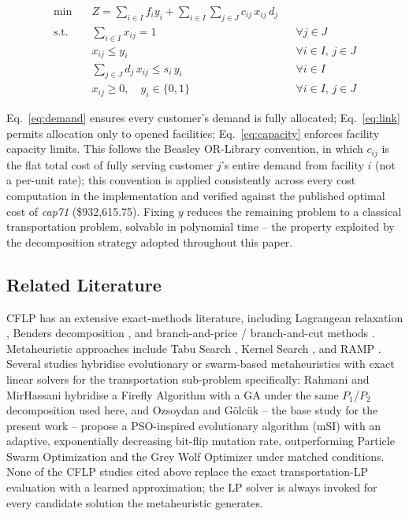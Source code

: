 \documentclass[conference]{IEEEtran}
\begin{document}
\begin{align}
\min \quad & Z = \sum_{i \in I} f_i y_i + \sum_{i \in I} \sum_{j \in J} c_{ij}\, x_{ij}\, d_j
\label{eq:obj} \\
\text{s.t.} \quad
& \sum_{i \in I} x_{ij} = 1 && \forall j \in J \label{eq:demand} \\
& x_{ij} \le y_i && \forall i \in I,\, j \in J \label{eq:link} \\
& \sum_{j \in J} d_j\, x_{ij} \le s_i\, y_i && \forall i \in I \label{eq:capacity} \\
& x_{ij} \ge 0, \quad y_i \in \{0,1\} && \forall i \in I,\, j \in J \label{eq:domain}
\end{align}

Eq.~\eqref{eq:demand} ensures every customer's demand is fully allocated;
Eq.~\eqref{eq:link} permits allocation only to opened facilities;
Eq.~\eqref{eq:capacity} enforces facility capacity limits. This follows the
Beasley OR-Library convention, in which $c_{ij}$ is the flat total cost of
fully serving customer $j$'s entire demand from facility $i$ (not a per-unit
rate); this convention is applied consistently across every cost computation
in the implementation and verified against the published optimal cost of
\emph{cap71} (\$932{,}615.75). Fixing $y$ reduces the remaining problem to a
classical transportation problem, solvable in polynomial time -- the property
exploited by the decomposition strategy adopted throughout this paper.

\subsection{Related Literature}

CFLP has an extensive exact-methods literature, including Lagrangean
relaxation \citep{christofides1983,beasley1988}, Benders decomposition
\citep{vanroy1986,wentges1996}, and branch-and-price / branch-and-cut methods
\citep{klose2007,fischetti2016}. Metaheuristic approaches include Tabu Search
\citep{sun2012}, Kernel Search \citep{guastaroba2012}, and RAMP
\citep{matos2021}. Several studies hybridise evolutionary or swarm-based
metaheuristics with exact linear solvers for the transportation sub-problem
specifically: Rahmani and MirHassani \citep{rahmani2014} hybridise a Firefly
Algorithm with a GA under the same $P_1$/$P_2$ decomposition used here, and
Ozsoydan and G\"{o}lc\"{u}k \citep{ozsoydan2023} -- the base study for the
present work -- propose a PSO-inspired evolutionary algorithm (mSI) with an
adaptive, exponentially decreasing bit-flip mutation rate, outperforming
Particle Swarm Optimization and the Grey Wolf Optimizer under matched
conditions. None of the CFLP studies cited above replace the exact
transportation-LP evaluation with a learned approximation; the LP solver is
always invoked for every candidate solution the metaheuristic generates.
\end{document}
